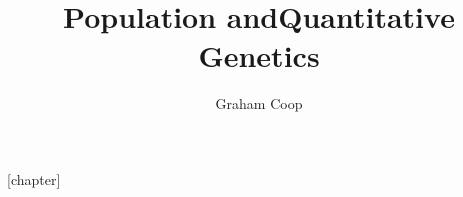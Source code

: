 

\newcommand{\E}{\mathbb{E}}
\renewcommand{\P}{\mathbb{P}}
\newcommand{\half}{\tfrac{1}{2}}

\usepackage[authoryear]{natbib}

\newcommand{\wbar}{\overline{w}}
\newcommand{\eqn}{eqn}
\newcommand{\fis}{F_{\mathrm{IS}}}
\newcommand{\fit}{F_{\mathrm{IT}}}
\newcommand{\fst}{F_{\mathrm{ST}}}
\newcommand{\Wbar}{\overline{W}}
\newcommand{\dNdS}{\nicefrac{d_N}{d_S}}
\newcommand{\graham}[1]{\todo[size=\scriptsize, color=red!50]{#1}}

\newcommand{\nicefrac}[2]{\frac{#1}{#2}}

[chapter]  %



\newenvironment{question}
{{\bf Question}}

  {  }



\title{Population and\newline Quantitative \newline Genetics}
\author{Graham Coop}


\date{}
\maketitle
\newpage












